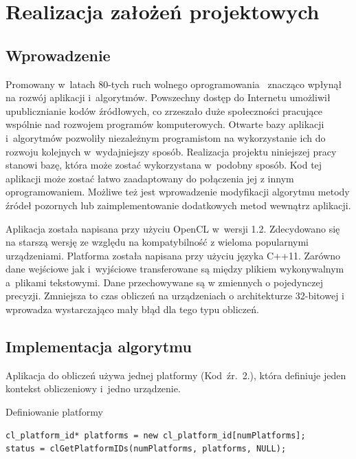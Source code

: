 \chapter{Realizacja założeń projektowych}\label{cha:rzp}


\section{Wprowadzenie}\label{sec:wprowadzenie}


Promowany w~latach 80-tych ruch wolnego oprogramowania~\cite{b23} znacząco wpłynął na rozwój aplikacji i~algorytmów. Powszechny dostęp do Internetu umożliwił upublicznianie kodów źródłowych, co zrzeszało duże społeczności pracujące wspólnie nad rozwojem programów komputerowych. Otwarte bazy aplikacji i~algorytmów pozwoliły niezależnym programistom  na wykorzystanie ich do rozwoju kolejnych w~wydajniejszy sposób. Realizacja projektu niniejszej pracy stanowi bazę, która może zostać wykorzystana w~podobny sposób. Kod tej aplikacji może zostać łatwo zaadaptowany do połączenia jej z innym oprogramowaniem. Możliwe też jest wprowadzenie modyfikacji algorytmu metody źródeł pozornych  lub zaimplementowanie dodatkowych metod wewnątrz aplikacji.


Aplikacja została napisana przy użyciu OpenCL w~wersji 1.2. Zdecydowano się na starszą wersję ze względu na kompatybilność z wieloma popularnymi urządzeniami. Platforma została napisana przy użyciu języka C++11. Zarówno dane wejściowe jak i~wyjściowe transferowane są między plikiem wykonywalnym a~plikami tekstowymi. Dane przechowywane są w zmiennych o pojedynczej precyzji. Zmniejsza to czas obliczeń na urządzeniach o architekturze 32-bitowej i wprowadza wystarczająco mały błąd dla tego typu obliczeń.




\section{Implementacja algorytmu}\label{sec:ra}

Aplikacja do obliczeń używa jednej platformy (Kod~źr.~2.), która definiuje jeden kontekst obliczeniowy i~jedno urządzenie.

\begin{program}[H]
\caption{Definiowanie platformy}
\begin{lstlisting}
cl_platform_id* platforms = new cl_platform_id[numPlatforms];
status = clGetPlatformIDs(numPlatforms, platforms, NULL);
\end{lstlisting}
\end{program}


